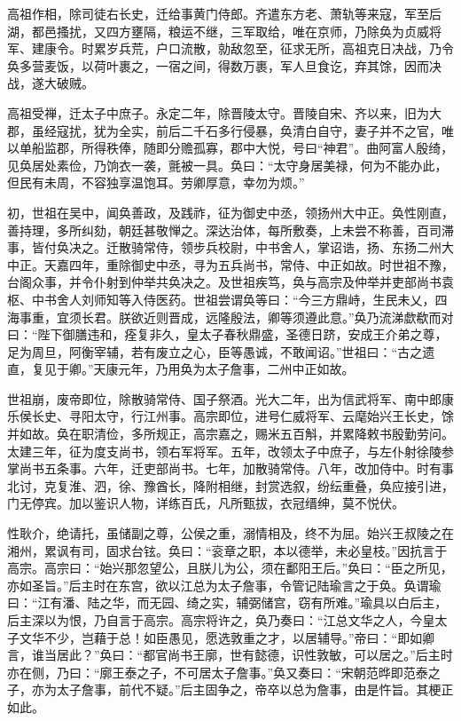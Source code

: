 \documentclass[]{article}
\begin{document}
高祖作相，除司徒右长史，迁给事黄门侍郎。齐遣东方老、萧轨等来寇，军至后湖，都邑搔扰，又四方壅隔，粮运不继，三军取给，唯在京师，乃除奂为贞威将军、建康令。时累岁兵荒，户口流散，勍敌忽至，征求无所，高祖克日决战，乃令奂多营麦饭，以荷叶裹之，一宿之间，得数万裹，军人旦食讫，弃其馀，因而决战，遂大破贼。

高祖受禅，迁太子中庶子。永定二年，除晋陵太守。晋陵自宋、齐以来，旧为大郡，虽经寇扰，犹为全实，前后二千石多行侵暴，奂清白自守，妻子并不之官，唯以单船监郡，所得秩俸，随即分赡孤寡，郡中大悦，号曰``神君''。曲阿富人殷绮，见奂居处素俭，乃饷衣一袭，氈被一具。奂曰：``太守身居美禄，何为不能办此，但民有未周，不容独享温饱耳。劳卿厚意，幸勿为烦。''

初，世祖在吴中，闻奂善政，及践祚，征为御史中丞，领扬州大中正。奂性刚直，善持理，多所纠劾，朝廷甚敬惮之。深达治体，每所敷奏，上未尝不称善，百司滞事，皆付奂决之。迁散骑常侍，领步兵校尉，中书舍人，掌诏诰，扬、东扬二州大中正。天嘉四年，重除御史中丞，寻为五兵尚书，常侍、中正如故。时世祖不豫，台阁众事，并令仆射到仲举共奂决之。及世祖疾笃，奂与高宗及仲举并吏部尚书袁枢、中书舍人刘师知等入侍医药。世祖尝谓奂等曰：``今三方鼎峙，生民未乂，四海事重，宜须长君。朕欲近则晋成，远隆殷法，卿等须遵此意。''奂乃流涕歔欷而对曰：``陛下御膳违和，痊复非久，皇太子春秋鼎盛，圣德日跻，安成王介弟之尊，足为周旦，阿衡宰辅，若有废立之心，臣等愚诚，不敢闻诏。''世祖曰：``古之遗直，复见于卿。''天康元年，乃用奂为太子詹事，二州中正如故。

世祖崩，废帝即位，除散骑常侍、国子祭酒。光大二年，出为信武将军、南中郎康乐侯长史、寻阳太守，行江州事。高宗即位，进号仁威将军、云麾始兴王长史，馀并如故。奂在职清俭，多所规正，高宗嘉之，赐米五百斛，并累降敕书殷勤劳问。太建三年，征为度支尚书，领右军将军。五年，改领太子中庶子，与左仆射徐陵参掌尚书五条事。六年，迁吏部尚书。七年，加散骑常侍。八年，改加侍中。时有事北讨，克复淮、泗，徐、豫酋长，降附相继，封赏选叙，纷纭重叠，奂应接引进，门无停宾。加以鉴识人物，详练百氏，凡所甄拔，衣冠缙绅，莫不悦伏。

性耿介，绝请托，虽储副之尊，公侯之重，溺情相及，终不为屈。始兴王叔陵之在湘州，累讽有司，固求台铉。奂曰：``衮章之职，本以德举，未必皇枝。''因抗言于高宗。高宗曰：``始兴那忽望公，且朕儿为公，须在鄱阳王后。''奂曰：``臣之所见，亦如圣旨。''后主时在东宫，欲以江总为太子詹事，令管记陆瑜言之于奂。奂谓瑜曰：``江有潘、陆之华，而无园、绮之实，辅弼储宫，窃有所难。''瑜具以白后主，后主深以为恨，乃自言于高宗。高宗将许之，奂乃奏曰：``江总文华之人，今皇太子文华不少，岂藉于总！如臣愚见，愿选敦重之才，以居辅导。''帝曰：``即如卿言，谁当居此？''奂曰：``都官尚书王廓，世有懿德，识性敦敏，可以居之。''后主时亦在侧，乃曰：``廓王泰之子，不可居太子詹事。''奂又奏曰：``宋朝范晔即范泰之子，亦为太子詹事，前代不疑。''后主固争之，帝卒以总为詹事，由是忤旨。其梗正如此。
\end{document}
